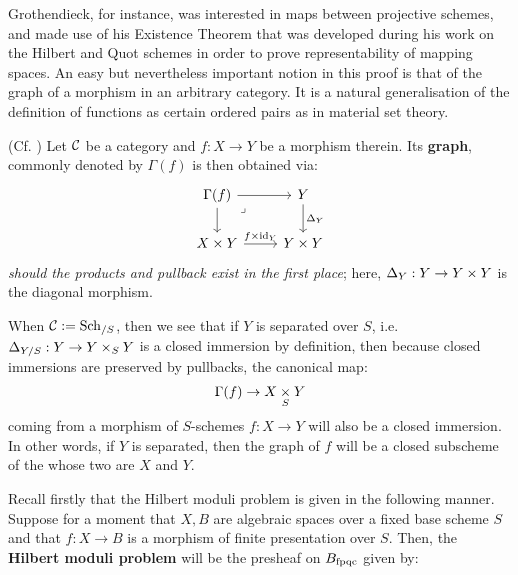         Grothendieck, for instance, was interested in maps between projective schemes, and made use of his Existence Theorem that was developed during his work on the Hilbert and Quot schemes in order to prove representability of mapping spaces. An easy but nevertheless important notion in this proof is that of the graph of a morphism in an arbitrary category. It is a natural generalisation of the definition of functions as certain ordered pairs as in material set theory. 
        \begin{definition} \label{def: graphs_of_morphisms}
            (Cf. \cite[\href{https://stacks.math.columbia.edu/tag/024T}{Tag 024T}]{stacks-project}) Let $\mathcal{C}$ be a category and $f: X \to Y$ be a morphism therein. Its \textbf{graph}, commonly denoted by $\Gamma(f)$ is then obtained via:
                $$
                    \begin{tikzcd}
                    {\Gamma(f)} & Y \\
                    {X \x Y} & {Y \x Y}
                    \arrow[from=1-1, to=1-2]
                    \arrow[from=1-1, to=2-1]
                    \arrow["\lrcorner"{anchor=center, pos=0.125}, draw=none, from=1-1, to=2-2]
                    \arrow["{\Delta_Y}", from=1-2, to=2-2]
                    \arrow["{f \x \id_Y}", from=2-1, to=2-2]
                    \end{tikzcd}
                $$
            \textit{should the products and pullback exist in the first place}; here, $\Delta_Y: Y \to Y \x Y$ is the diagonal morphism.
        \end{definition}
        \begin{remark}
            When $\mathcal{C} := \mathrm{Sch}_{/S}$, then we see that if $Y$ is separated over $S$, i.e. $\Delta_{Y/S}: Y \to Y \x_S Y$ is a closed immersion by definition, then because closed immersions are preserved by pullbacks, the canonical map:
                $$\Gamma(f) \to X \x_S Y$$
            coming from a morphism of $S$-schemes $f: X \to Y$ will also be a closed immersion. In other words, if $Y$ is separated, then the graph of $f$ will be a closed subscheme of the  whose two  are $X$ and $Y$.
        \end{remark}
        Recall firstly that the Hilbert moduli problem is given in the following manner. Suppose for a moment that $X, B$ are algebraic spaces over a fixed base scheme $S$ and that $f: X \to B$ is a morphism of finite presentation over $S$. Then, the \textbf{Hilbert moduli problem} will be the presheaf on $B_{\mathrm{fpqc}}$ given by:
